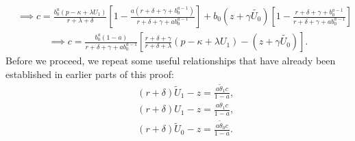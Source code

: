 \documentclass[12pt]{article} %
\theoremstyle{definition}
\begin{document}
\begin{appendix}
\begin{align*}
& \implies c =  \frac{b_0^a(p-\kappa+\lambda U_1)}{r+\lambda+\delta} \left[1 - \frac{a(r+\delta+\gamma+b_0^{a-1})}{r+\delta+\gamma+ab_0^{a-1}}\right]+ {b}_0 (z+\gamma \tilde{U_0}) \left[1 - \frac{r+\delta+\gamma+b_0^{a-1}}{r+\delta+\gamma+ab_0^{a-1}}\right] 
\end{align*}
\begin{eqnarray}
\implies c =  \frac{b_0^a(1-a)}{r+\delta+\gamma+ab_0^{a-1}}\left[\frac{r+\delta+\gamma}{r+\delta+\lambda}(p-\kappa+\lambda U_1) - (z+\gamma \tilde{U_0}) \right].  %
\label{equation foc b0}   
\end{eqnarray}
Before we proceed, we repeat some useful relationships that have already been established in earlier parts of this proof: 
\begin{eqnarray}
&& (r+\delta)\tilde{U}_1-z = \frac{a \tilde{\theta}_1c}{1-a},\label{eq repeat 1 tilde} \\
&& (r+\delta)U_1-z = \frac{a \theta_1c}{1-a}, \label{eq repeat 1} \\
&& (r+\delta)\tilde{U}_0-z = \frac{a \tilde{\theta}_0c}{1-a}.  \label{eq repeat 0 tilde} 
\end{eqnarray}


\end{appendix}
\end{document}
